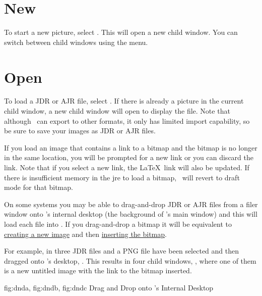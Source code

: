 \section{New}\label{sec:newimage}


To start a new picture, select . This will open
a new child window. You can switch between child windows using the
 menu.

\section{Open}\label{sec:loadimage}


To load a \gls{JDR} or \gls{AJR} file, select .
If there is already a picture in the current child window, a new
child window will open to display the file. Note that although
\FlowframTk\ can export to other formats, it only has limited
import capability, so be sure to save your images as 
\gls{JDR} or \gls{AJR} files.

If you load an image that contains a link to a \gls{bitmap} and
the bitmap is no longer in the same location, you will be prompted
for a new link or you can discard the link. Note that if you
select a new link, the \LaTeX\ link will also be updated.
If there is insufficient memory in the \gls{jre} to load a bitmap,
\FlowframTk\ will revert to draft mode for that bitmap.

On some systems you may be able to \gls{drag-and-drop} \gls*{JDR} or
\gls*{AJR} files from a filer window onto \FlowframTk's internal desktop
(the  background of \FlowframTk's main window) and this
will load each file into \FlowframTk. If you \gls*{drag-and-drop} a
\gls{bitmap} it will be equivalent to \hyperref[sec:newimage]{creating a
new image} and then \hyperref[sec:insertbitmap]{inserting the bitmap}.

For example, in  three \gls{JDR} files and
a PNG file have been selected and then dragged onto \FlowframTk's
desktop, . This results in four child
windows, , where one of them is a new
untitled image with the link to the \gls{bitmap} inserted.

{
  {fig:dnda}{}{},
  {fig:dndb}{}{},
  {fig:dndc}{}{}
}
{Drag and Drop onto \FlowframTk's Internal Desktop}

